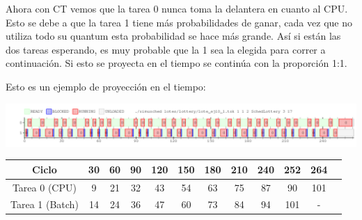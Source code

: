Ahora con CT vemos que la tarea 0 nunca toma la delantera en cuanto al CPU. Esto se debe a que la tarea 1 tiene más probabilidades de ganar, cada vez que no utiliza 
todo su quantum esta probabilidad se hace más grande. Así si están las dos tareas esperando, es muy probable que la 1 sea la elegida para correr a continuación.
Si esto se proyecta en el tiempo se continúa con la proporción 1:1. 

Esto es un ejemplo de proyección en el tiempo:

\begin{center}
 \includegraphics[scale=0.48]{./Lottery/ej10_CON_CT_muchosciclos.png}
\end{center}

\begin{center}
\begin{tabular}{|c|c|c|c|c|c|c|c|c|c|c|c|}
\hline
Ciclo & 30 & 60 & 90 & 120 & 150 & 180 & 210 & 240 & 252 & 264\\
\hline
\hline
Tarea 0 (CPU) & 9 & 21 & 32 & 43 & 54 & 63 & 75 & 87 & 90 & 101\\
\hline
Tarea 1 (Batch) & 14 & 24 & 36 & 47 & 60 & 73 & 84 & 94 & 101 & -\\
\hline
\end{tabular}\end{center}

